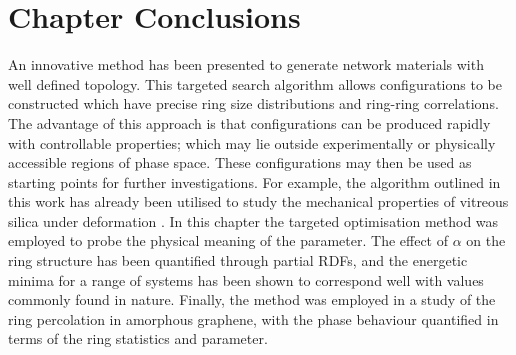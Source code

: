 \section{Chapter Conclusions}

An innovative method has been presented to generate \td{} network materials with well defined topology. 
This targeted \mc{} search algorithm allows configurations to be constructed which have precise ring size distributions and ring\--ring correlations.
The advantage of this approach is that configurations can be produced rapidly with controllable properties; which may lie outside experimentally or physically accessible regions of phase space.
These configurations may then be used as starting points for further investigations.
For example, the algorithm outlined in this work has already been utilised to study the mechanical properties of vitreous silica under deformation \cite{Bamer2020,Ebrahem2020a}.
In this chapter the targeted optimisation method was employed to probe the physical meaning of the \aw{} parameter.
The effect of $\alpha$ on the ring structure has been quantified through partial RDFs, and the energetic minima for a range of systems has been shown to correspond well with values commonly found in nature.
Finally, the method was employed in a study of the ring percolation in amorphous graphene, with the phase behaviour quantified in terms of the ring statistics and \aw{} parameter.

 





